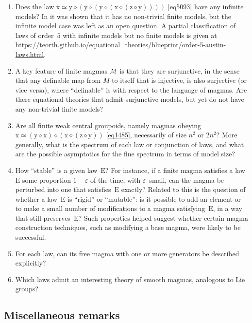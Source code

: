\documentclass[12pt]{amsart}
\theoremstyle{definition}
\newcommand{\x}{\mathrm{x}}
\newcommand{\y}{\mathrm{y}}
\newcommand{\z}{\mathrm{z}}
\newcommand{\op}{\diamond}
\newcommand{\formaleq}{\simeq}
\newcommand{\eps}{\varepsilon}
\newcommand{\Magma}{{\mathcal{M}}}
\newcommand{\E}{\mathrm{E}}
\begin{document}
\begin{enumerate}[resume*]
  \item Does the law $\x \formaleq \y \op (\y \op (\y \op (\x \op (\z \op \y))))$ \eqref{eq5093} have any infinite models? In \cite{Kisielewicz2} it was shown that it has no non-trivial finite models, but the infinite model case was left as an open question.  A partial classification of laws of order~$5$ with infinite models but no finite models is given at \url{https://teorth.github.io/equational_theories/blueprint/order-5-austin-laws.html}.

  \item A key feature of finite magmas $\Magma$ is that they are surjunctive, in the sense that any definable map from $M$ to itself that is injective, is also surjective (or vice versa), where ``definable'' is with respect to the language of magmas.  Are there equational theories that admit surjunctive models, but yet do not have any non-trivial finite models?

  \item Are all finite weak central groupoids, namely magmas obeying $\x \formaleq (\y \op \x) \op (\x \op (\z \op \y))$ \eqref{eq1485}, necessarily of size $n^2$ or $2n^2$?  More generally, what is the spectrum of each law or conjunction of laws, and what are the possible asymptotics for the fine spectrum in terms of model size?

  \item How ``stable'' is a given law~$\E$?  For instance, if a finite magma satisfies a law~$\E$ some proportion $1-\eps$ of the time, with $\eps$~small, can the magma be perturbed into one that satisfies~$\E$ exactly?  Related to this is the question of whether a law~$\E$ is ``rigid'' or ``mutable'': is it possible to add an element or to make a small number of modifications to a magma satisfying~$\E$, in a way that still preserves~$\E$?  Such properties helped suggest whether certain magma construction techniques, such as modifying a base magma, were likely to be successful.

  \item For each law, can its free magma with one or more generators be described explicitly?

  \item Which laws admit an interesting theory of smooth magmas, analogous to Lie groups?
\end{enumerate}

\subsection{Miscellaneous remarks}
\end{document}
